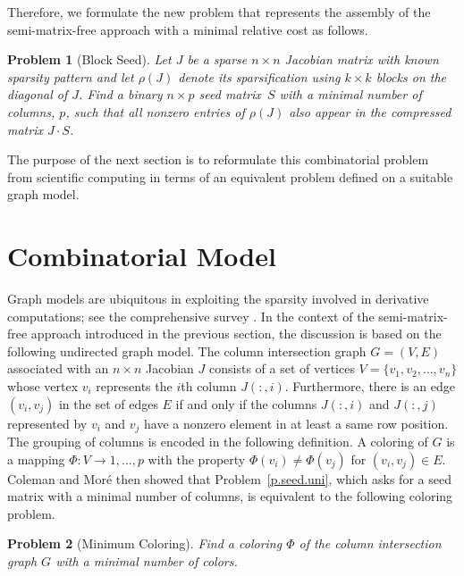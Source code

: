 \documentclass[12pt, oneside]{book}
\newtheorem{problem}{Problem}
\newcommand{\sparsifysymbol}{\ensuremath{\rho}}
\newcommand{\sparsify}[1]{\ensuremath{\sparsifysymbol(#1)}}
\begin{document}
Therefore, we formulate the new problem that represents the assembly of the
semi-matrix-free approach with a minimal relative cost as follows.
%
\begin{problem}[Block Seed]
\label{p:block}
%
Let $J$ be a sparse $n \times n$ Jacobian matrix with known sparsity pattern and let
\sparsify{J} denote its sparsification using $k \times k$ blocks on the diagonal of $J$.
Find a binary $n \times p$ seed matrix~$S$ with a minimal number of columns, $p$, such
that all nonzero entries of \sparsify{J} also appear in the compressed matrix $J \cdot
S$.
\end{problem}

The purpose of the next section is to reformulate this combinatorial problem from
scientific computing in terms of an equivalent problem defined on a suitable graph model.

\section{Combinatorial Model}
\label{s.modeling}
Graph models are ubiquitous in exploiting the sparsity involved in derivative
computations; see the comprehensive survey \cite{Gebremedhin05whatcolor}. In the context of the
semi-matrix-free approach introduced in the previous section, the discussion is based on
the following undirected graph model.
%
%
The column intersection graph $G = (V,E)$ associated with an $n \times n$ Jacobian $J$
consists of a set of vertices $V=\{v_1, v_2, \dots, v_n\}$ whose vertex $v_i$ represents
the $i$th column $J(:,i)$. Furthermore, there is an edge $(v_i,v_j)$ in the set of edges
$E$ if and only if the columns $J(:,i)$ and $J(:,j)$ represented by $v_i$ and $v_j$ have
a nonzero element in at least a same row position.
%
The grouping of columns is encoded in the following definition.
%
A coloring of $G$ is a mapping $\Phi : V \to {1, \dots, p}$ with the property
$\Phi(v_i)\neq \Phi(v_j)$ for $(v_i,v_j) \in E$.
%
Coleman and Mor\'{e} \cite{Coleman1983EoS} then showed that Problem~\ref{p.seed.uni}, which
asks for a seed matrix with a minimal number of columns, is equivalent to the following
coloring problem.
%
\begin{problem}[Minimum Coloring]
\label{p:mincol}
%
Find a coloring $\Phi$ of the column intersection graph $G$ with a minimal number of
colors.
\end{problem}
\end{document}
